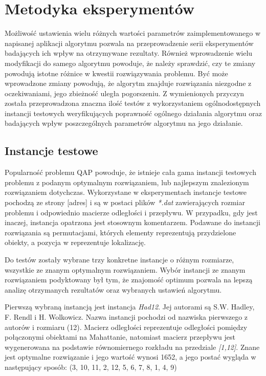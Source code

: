 \chapter{Metodyka eksperymentów}
\label{cha:metodyka}

Możliwość ustawienia wielu różnych wartości parametrów zaimplementowanego w napisanej aplikacji algorytmu pozwala na przeprowadzenie serii eksperymentów badających ich wpływ na otrzymywane rezultaty. Również wprowadzenie wielu modyfikacji do samego algorytmu powoduje, że należy sprawdzić, czy te zmiany powodują istotne różnice w kwestii rozwiązywania problemu. Być może wprowadzone zmiany powodują, że algorytm znajduje rozwiązania niezgodne z oczekiwaniami, jego zbieżność uległa pogorszeniu. Z wymienionych przyczyn została przeprowadzona znaczna ilość testów z wykorzystaniem ogólnodostępnych instancji testowych weryfikujących poprawność ogólnego działania algorytmu oraz badających wpływ poszczególnych parametrów algorytmu na jego działanie.
 
\section{Instancje testowe}
\label{sec:instancje}
Popularność problemu QAP powoduje, że istnieje cała gama instancji testowych problemu z podanym optymalnym rozwiązaniem, lub najlepszym znalezionym rozwiązaniem dotychczas. Wykorzystane w eksperymentach instancje testowe pochodzą ze strony [adres] i są w postaci plików \textit{*.dat} zawierających rozmiar problemu i odpowiednio macierze odległości i przepływu. W przypadku, gdy jest inaczej, instancja opatrzona jest stosownym komentarzem. Podawane do instancji rozwiązania są permutacjami, których elementy reprezentują przydzielone obiekty, a pozycja w reprezentuje lokalizację.

Do testów zostały wybrane trzy konkretne instancje o różnym rozmiarze, wszystkie ze znanym optymalnym rozwiązaniem. Wybór instancji ze znanym rozwiązaniem podyktowany był tym, że znajomość optimum pozwala na lepszą analizę otrzymanych rezultatów oraz wybranych ustawień algorytmu.

Pierwszą wybraną instancją jest instancja \textit{Had12}. Jej autorami są S.W. Hadley, F. Rendl i H. Wolkowicz. Nazwa instancji pochodzi od nazwiska pierwszego z autorów i rozmiaru (12). Macierz odległości reprezentuje odległości pomiędzy połączonymi obiektami na Mahattanie, natomiast macierz przepływu jest wygenerowana na podstawie równomiernego rozkładu na przedziale \textit{[1,12]}. Znane jest optymalne rozwiązanie i jego wartość wynosi 1652, a jego postać wygląda w następujący sposób:
\newline
(3, 10, 11, 2, 12, 5, 6, 7, 8, 1, 4, 9)

